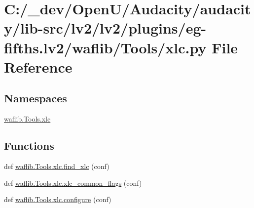 \hypertarget{lv2_2plugins_2eg-fifths_8lv2_2waflib_2_tools_2xlc_8py}{}\section{C\+:/\+\_\+dev/\+Open\+U/\+Audacity/audacity/lib-\/src/lv2/lv2/plugins/eg-\/fifths.lv2/waflib/\+Tools/xlc.py File Reference}
\label{lv2_2plugins_2eg-fifths_8lv2_2waflib_2_tools_2xlc_8py}
\subsection*{Namespaces}
\begin{DoxyCompactItemize}
\item 
 \hyperlink{namespacewaflib_1_1_tools_1_1xlc}{waflib.\+Tools.\+xlc}
\end{DoxyCompactItemize}
\subsection*{Functions}
\begin{DoxyCompactItemize}
\item 
def \hyperlink{namespacewaflib_1_1_tools_1_1xlc_a826e1c437600d3c067bccbbd4064dec9}{waflib.\+Tools.\+xlc.\+find\+\_\+xlc} (conf)
\item 
def \hyperlink{namespacewaflib_1_1_tools_1_1xlc_ae679a412086a4361649983127db4039d}{waflib.\+Tools.\+xlc.\+xlc\+\_\+common\+\_\+flags} (conf)
\item 
def \hyperlink{namespacewaflib_1_1_tools_1_1xlc_ac8361aabba7f34ddea8a8e153d9d8315}{waflib.\+Tools.\+xlc.\+configure} (conf)
\end{DoxyCompactItemize}
